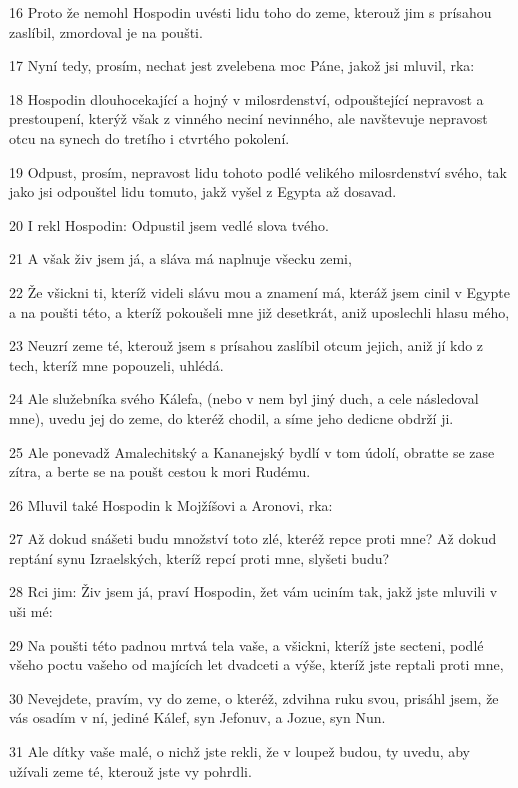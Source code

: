 \par 16 Proto že nemohl Hospodin uvésti lidu toho do zeme, kterouž jim s prísahou zaslíbil, zmordoval je na poušti.
\par 17 Nyní tedy, prosím, nechat jest zvelebena moc Páne, jakož jsi mluvil, rka:
\par 18 Hospodin dlouhocekající a hojný v milosrdenství, odpouštející nepravost a prestoupení, kterýž však z vinného neciní nevinného, ale navštevuje nepravost otcu na synech do tretího i ctvrtého pokolení.
\par 19 Odpust, prosím, nepravost lidu tohoto podlé velikého milosrdenství svého, tak jako jsi odpouštel lidu tomuto, jakž vyšel z Egypta až dosavad.
\par 20 I rekl Hospodin: Odpustil jsem vedlé slova tvého.
\par 21 A však živ jsem já, a sláva má naplnuje všecku zemi,
\par 22 Že všickni ti, kteríž videli slávu mou a znamení má, kteráž jsem cinil v Egypte a na poušti této, a kteríž pokoušeli mne již desetkrát, aniž uposlechli hlasu mého,
\par 23 Neuzrí zeme té, kterouž jsem s prísahou zaslíbil otcum jejich, aniž jí kdo z tech, kteríž mne popouzeli, uhlédá.
\par 24 Ale služebníka svého Kálefa, (nebo v nem byl jiný duch, a cele následoval mne), uvedu jej do zeme, do kteréž chodil, a síme jeho dedicne obdrží ji.
\par 25 Ale ponevadž Amalechitský a Kananejský bydlí v tom údolí, obratte se zase zítra, a berte se na poušt cestou k mori Rudému.
\par 26 Mluvil také Hospodin k Mojžíšovi a Aronovi, rka:
\par 27 Až dokud snášeti budu množství toto zlé, kteréž repce proti mne? Až dokud reptání synu Izraelských, kteríž repcí proti mne, slyšeti budu?
\par 28 Rci jim: Živ jsem já, praví Hospodin, žet vám uciním tak, jakž jste mluvili v uši mé:
\par 29 Na poušti této padnou mrtvá tela vaše, a všickni, kteríž jste secteni, podlé všeho poctu vašeho od majících let dvadceti a výše, kteríž jste reptali proti mne,
\par 30 Nevejdete, pravím, vy do zeme, o kteréž, zdvihna ruku svou, prisáhl jsem, že vás osadím v ní, jediné Kálef, syn Jefonuv, a Jozue, syn Nun.
\par 31 Ale dítky vaše malé, o nichž jste rekli, že v loupež budou, ty uvedu, aby užívali zeme té, kterouž jste vy pohrdli.
